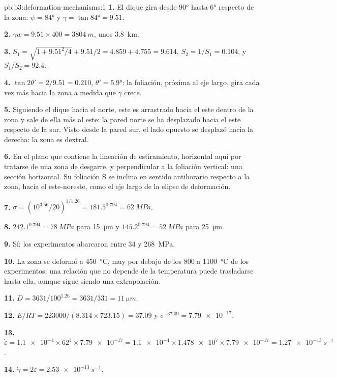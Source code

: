 \begin{solution}{pb:b3:deformation-mechanisms:1}
\textbf{1.} El dique gira desde \ang{90} hasta \ang{6} respecto de la zona: $\psi =
\ang{84}$ y $\gamma = \tan\ang{84} = 9.51$.

\textbf{2.} $\gamma w = 9.51\times400 = \qty{3804}{m}$, unos \qty{3.8}{km}.

\textbf{3.} $S_1 = \sqrt{1 + 9.51^2/4} + 9.51/2 = 4.859 + 4.755 = 9.614$,
$S_2 = 1/S_1 = 0.104$, y $S_1/S_2 = 92.4$.

\textbf{4.} $\tan2\theta' = 2/9.51 = 0.210$, $\theta' = \ang{5.9}$: la
foliación, próxima al eje largo, gira cada vez más hacia la zona a medida que $\gamma$
crece.

\textbf{5.} Siguiendo el dique hacia el norte, este es arrastrado hacia el este dentro de la zona y
sale de ella más al este: la pared norte se ha desplazado hacia el este respecto de la sur.
Visto desde la pared sur, el lado opuesto se desplazó hacia la derecha: la zona es
dextral.

\textbf{6.} En el plano que contiene la lineación de estiramiento, horizontal aquí
por tratarse de una zona de desgarre, y perpendicular a la foliación vertical: una
sección horizontal. Su foliación S se inclina en sentido antihorario respecto a la zona, hacia
el este-noreste, como el eje largo de la elipse de deformación.

\textbf{7.} $\sigma = (10^{3.56}/20)^{1/1.26} = 181.5^{0.794} = \qty{62}{MPa}$.

\textbf{8.} $242.1^{0.794} = \qty{78}{MPa}$ para \qty{15}{\micro m} y
$145.2^{0.794} = \qty{52}{MPa}$ para \qty{25}{\micro m}.

\textbf{9.} Sí: los experimentos abarcaron entre 34 y \qty{268}{MPa}.

\textbf{10.} La zona se deformó a \qty{450}{\celsius}, muy por debajo de los 800 a
\qty{1100}{\celsius} de los experimentos; una relación que no depende de
la temperatura puede trasladarse hasta ella, aunque sigue siendo una
extrapolación.

\textbf{11.} $D = 3631/100^{1.26} = 3631/331 = \qty{11}{\micro m}$.

\textbf{12.} $E/RT = 223000/(8.314\times723.15) = 37.09$ y $e^{-37.09} =
\num{7.79e-17}$.

\textbf{13.} $\dot\varepsilon = \num{1.1e-4}\times62^4\times\num{7.79e-17} =
\num{1.1e-4}\times\num{1.478e7}\times\num{7.79e-17} = \qty{1.27e-13}{s^{-1}}$.

\textbf{14.} $\dot\gamma = 2\dot\varepsilon = \qty{2.53e-13}{s^{-1}}$.


\end{solution}
